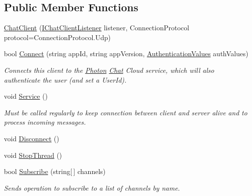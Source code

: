 \subsection*{Public Member Functions}
\begin{DoxyCompactItemize}
\item 
\hyperlink{class_exit_games_1_1_client_1_1_photon_1_1_chat_1_1_chat_client_a5088b919addd1ae88cf8ed72d68c52c2}{Chat\+Client} (\hyperlink{interface_exit_games_1_1_client_1_1_photon_1_1_chat_1_1_i_chat_client_listener}{I\+Chat\+Client\+Listener} listener, Connection\+Protocol protocol=Connection\+Protocol.\+Udp)
\item 
bool \hyperlink{class_exit_games_1_1_client_1_1_photon_1_1_chat_1_1_chat_client_a4fb7f78c7820b02fb0ec3c173ff0d2d5}{Connect} (string app\+Id, string app\+Version, \hyperlink{class_exit_games_1_1_client_1_1_photon_1_1_chat_1_1_authentication_values}{Authentication\+Values} auth\+Values)
\begin{DoxyCompactList}\small\item\em Connects this client to the \hyperlink{namespace_exit_games_1_1_client_1_1_photon}{Photon} \hyperlink{namespace_exit_games_1_1_client_1_1_photon_1_1_chat}{Chat} Cloud service, which will also authenticate the user (and set a User\+Id). \end{DoxyCompactList}\item 
void \hyperlink{class_exit_games_1_1_client_1_1_photon_1_1_chat_1_1_chat_client_a4e5b2c3dc8f4e43b053bd3436dd39c5f}{Service} ()
\begin{DoxyCompactList}\small\item\em Must be called regularly to keep connection between client and server alive and to process incoming messages. \end{DoxyCompactList}\item 
void \hyperlink{class_exit_games_1_1_client_1_1_photon_1_1_chat_1_1_chat_client_a21acfc202dc0114eabdba678e03f21f1}{Disconnect} ()
\item 
void \hyperlink{class_exit_games_1_1_client_1_1_photon_1_1_chat_1_1_chat_client_af9ac75f889489a06dbc8f6d7881367c4}{Stop\+Thread} ()
\item 
bool \hyperlink{class_exit_games_1_1_client_1_1_photon_1_1_chat_1_1_chat_client_aecfdac4a2de6577291597477bcaec9c7}{Subscribe} (string\mbox{[}$\,$\mbox{]} channels)
\begin{DoxyCompactList}\small\item\em Sends operation to subscribe to a list of channels by name. \end{DoxyCompactList}\item 

\end{DoxyCompactItemize}
